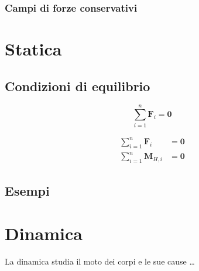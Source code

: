 \subsection{Campi di forze conservativi}



\chapter{Statica}

\section{Condizioni di equilibrio}
\begin{definition}
    \begin{equation}
        \sum_{i=1}^{n} \mathbf{F}_i = \mathbf{0}
    \end{equation}
\end{definition}

\begin{definition}
    \begin{equation}
    \begin{aligned}
        \sum_{i=1}^{n} \mathbf{F}_i & = \mathbf{0} \\
        \sum_{i=1}^{n} \mathbf{M}_{H,i} & = \mathbf{0}
    \end{aligned}
    \end{equation}
\end{definition}

\section{Esempi}


\chapter{Dinamica}\label{mechanics:dynamics}
La dinamica studia il moto dei corpi e le sue cause \dots
